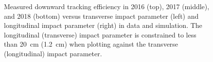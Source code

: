 \begin{figure}
\caption{Measured downward tracking efficiency in 2016 (top), 2017 (middle), and 2018 (bottom) versus transverse impact parameter (left) and longitudinal impact parameter (right) in data and simulation. The longitudinal (transverse) impact parameter is constrained to less than \SI{20}{\cm} (\SI{1.2}{\cm}) when plotting against the transverse (longitudinal) impact parameter.}
\label{displaced_trk_eff_vs_d0dz}
\end{figure}